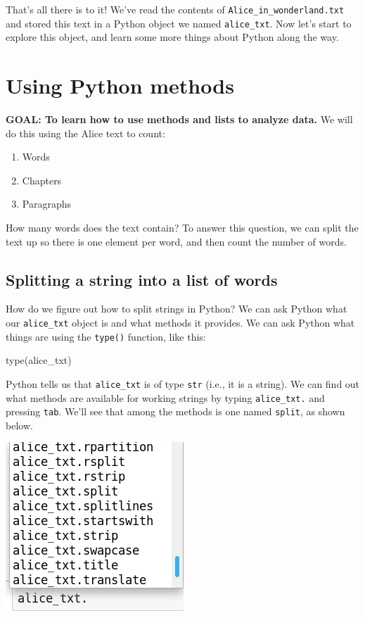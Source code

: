 \documentclass[]{book}
\newenvironment{Shaded}{\begin{snugshade}}{\end{snugshade}}
\newcommand{\BuiltInTok}[1]{#1}
\newcommand{\NormalTok}[1]{#1}
\providecommand{\tightlist}{%
  \setlength{\itemsep}{0pt}\setlength{\parskip}{0pt}}
\begin{document}
That's all there is to it! We've read the contents of \texttt{Alice\_in\_wonderland.txt} and stored this text in a Python object we named \texttt{alice\_txt}. Now let's start to explore this object, and learn some more things about Python along the way.

\hypertarget{using-python-methods}{%
\section{Using Python methods}\label{using-python-methods}}

\textbf{GOAL: To learn how to use methods and lists to analyze data.} We will do this using the Alice text to count:

\begin{enumerate}
\def\labelenumi{\arabic{enumi}.}
\tightlist
\item
  Words
\item
  Chapters
\item
  Paragraphs
\end{enumerate}

How many words does the text contain? To answer this question, we can split the text up so there is one element per word, and then count the number of words.

\hypertarget{splitting-a-string-into-a-list-of-words}{%
\subsection{Splitting a string into a list of words}\label{splitting-a-string-into-a-list-of-words}}

How do we figure out how to split strings in Python? We can ask Python what our \texttt{alice\_txt} object is and what methods it provides. We can ask Python what things are using the \texttt{type()} function, like this:

\begin{Shaded}
\begin{Highlighting}[]
\BuiltInTok{type}\NormalTok{(alice_txt)}
\end{Highlighting}
\end{Shaded}

Python tells us that \texttt{alice\_txt} is of type \texttt{str} (i.e., it is a string). We can find out what methods are available for working strings by typing \texttt{alice\_txt.} and pressing \texttt{tab}. We'll see that among the methods is one named \texttt{split}, as shown below.

\includegraphics{Python/PythonIntro/images/notebook_string_completion.png}
\end{document}
